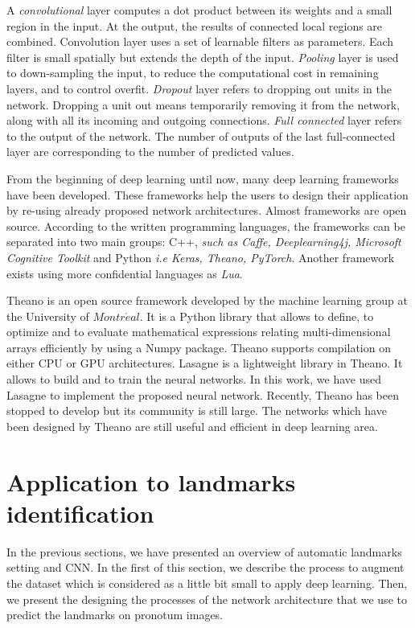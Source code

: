\documentclass{article} %
\begin{document}
\begin{multicols}{2}
A \textit{convolutional} layer computes a dot product between its weights and a small region in the input. At the output, the results of connected local regions are combined. Convolution layer uses a set of learnable filters as parameters. Each filter is small spatially but extends the depth of the input. \textit{Pooling} layer is used to down-sampling the input, to reduce the computational cost in remaining layers, and to control overfit. \textit{Dropout} layer refers to dropping out units in the network. Dropping a unit out means temporarily removing it from the network, along with all its incoming and outgoing connections. \textit{Full connected} layer refers to the output of the network. The number of outputs of the last full-connected layer are corresponding to the number of predicted values.

From the beginning of deep learning until now, many deep learning frameworks have been developed.
These frameworks help the users to design their application by re-using already proposed network architectures. Almost frameworks are open source. According to the written programming languages, the frameworks can be separated into two main groups: C++, \textit{such as Caffe, Deeplearning4j, Microsoft Cognitive Toolkit} and Python \textit{i.e Keras, Theano, PyTorch}. Another framework exists using more confidential languages as \textit{Lua}.

Theano \cite{theanoframework} is an open source framework developed by the machine learning group at the University of $Montr\acute{e}al$. It is a Python library that allows to define, to optimize and to evaluate mathematical expressions relating multi-dimensional arrays efficiently by using a Numpy package. Theano supports compilation on either CPU or GPU architectures. Lasagne \cite{lasagne} is a lightweight library in Theano. It allows to build and to train the neural networks. In this work, we have used Lasagne to implement the proposed neural network. Recently, Theano has been stopped to develop but its community is still large. The networks which have been designed by Theano are still useful and efficient in deep learning area.
\section{Application to landmarks identification}
\label{SecApp}
In the previous sections, we have presented an overview of automatic landmarks setting and CNN. In the first of this section, we describe the process to augment the dataset which is considered as a little bit small to apply deep learning. Then, we present the designing the processes of the network architecture that we use to predict the landmarks on pronotum images.


\end{multicols}
\end{document}

